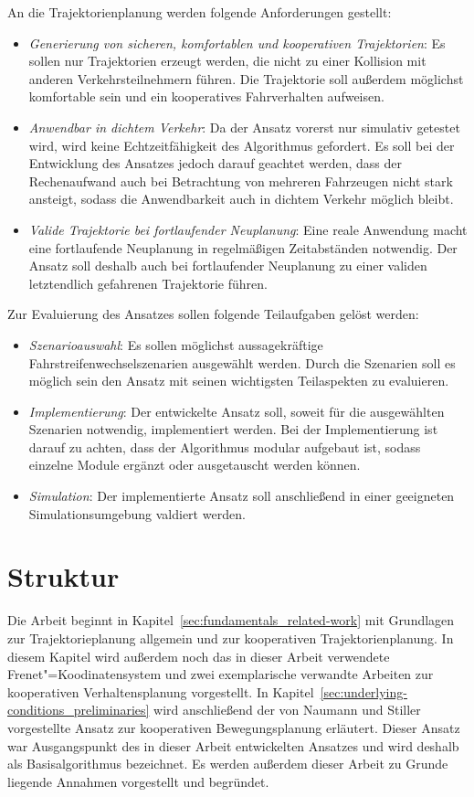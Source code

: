 An die Trajektorienplanung werden folgende Anforderungen gestellt:
\begin{itemize}
\item \textit{Generierung von sicheren, komfortablen und kooperativen Trajektorien}: Es sollen nur Trajektorien erzeugt werden, die nicht zu einer Kollision mit anderen Verkehrsteilnehmern f\"uhren. Die Trajektorie soll au{\ss}erdem m\"oglichst komfortable sein und ein kooperatives Fahrverhalten aufweisen. 
\item \textit{Anwendbar in dichtem Verkehr}: Da der Ansatz vorerst nur simulativ getestet wird, wird keine Echtzeitf\"ahigkeit des Algorithmus gefordert. Es soll bei der Entwicklung des Ansatzes jedoch darauf geachtet werden, dass der Rechenaufwand auch bei Betrachtung von mehreren Fahrzeugen nicht stark ansteigt, sodass die Anwendbarkeit auch in dichtem Verkehr m\"oglich bleibt.
\item \textit{Valide Trajektorie bei fortlaufender Neuplanung}: Eine reale Anwendung macht eine fortlaufende Neuplanung in regelm\"a{\ss}igen Zeitabst\"anden notwendig. Der Ansatz soll deshalb auch bei fortlaufender Neuplanung zu einer validen letztendlich gefahrenen Trajektorie f\"uhren.
\end{itemize}

Zur Evaluierung des Ansatzes sollen folgende Teilaufgaben gel\"ost werden:
\begin{itemize}
\item \textit{Szenarioauswahl}: Es sollen m\"oglichst aussagekr\"aftige Fahrstreifenwechselszenarien ausgew\"ahlt werden. Durch die Szenarien soll es m\"oglich sein den Ansatz mit seinen wichtigsten Teilaspekten zu evaluieren.
\item \textit{Implementierung}: Der entwickelte Ansatz soll, soweit f\"ur die ausgew\"ahlten Szenarien notwendig, implementiert werden. Bei der Implementierung ist darauf zu achten, dass der Algorithmus modular aufgebaut ist, sodass einzelne Module erg\"anzt oder ausgetauscht werden k\"onnen.
\item \textit{Simulation}: Der implementierte Ansatz soll anschlie{\ss}end in einer geeigneten Simulationsumgebung valdiert werden.
\end{itemize}

\section{Struktur}
Die Arbeit beginnt in Kapitel~\ref{sec:fundamentals_related-work} mit Grundlagen zur Trajektorieplanung allgemein und zur kooperativen Trajektorienplanung. 
In diesem Kapitel wird au{\ss}erdem noch das in dieser Arbeit verwendete Frenet"=Koodinatensystem und zwei exemplarische verwandte Arbeiten zur kooperativen Verhaltensplanung vorgestellt.
In Kapitel~\ref{sec:underlying-conditions_preliminaries} wird anschlie{\ss}end der von Naumann und Stiller \cite{Naumann2017} vorgestellte Ansatz zur kooperativen Bewegungsplanung erl\"autert.
Dieser Ansatz war Ausgangspunkt des in dieser Arbeit entwickelten Ansatzes und wird deshalb als Basisalgorithmus bezeichnet.
Es werden au{\ss}erdem dieser Arbeit zu Grunde liegende Annahmen vorgestellt und begr\"undet.

